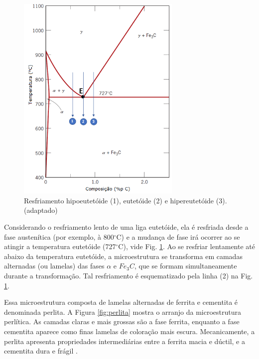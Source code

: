 \documentclass[
12pt,
openany, %
oneside, %
a4paper,			
english,			
brazil			        %
]{abntbibufjf}
\begin{document}
	\begin{figure}[H]
		\centering
		\includegraphics[width=0.7\textwidth]{eutetoide}
		\caption{Resfriamento hipoeutetóide (1), eutetóide (2) e hipereutetóide (3). \cite{callister2011materials} (adaptado)}
		\label{fig:eutetoide}
	\end{figure}

	Considerando o resfriamento lento de uma liga eutetóide, ela é resfriada desde a fase austenítica (por exemplo, à 800$^{\circ}$C) e a mudança de fase irá ocorrer ao se atingir a temperatura eutetóide (727$^{\circ}$C), vide Fig. \ref{fig:eutetoide}. Ao se resfriar lentamente até abaixo da temperatura eutetóide, a microestrutura se transforma em camadas alternadas (ou lamelas) das fases $\alpha$ e $Fe_3C$, que se formam simultaneamente durante a transformação. Tal resfriamento é esquematizado pela linha (2) na Fig. \ref{fig:eutetoide}.
	
	Essa microestrutura composta de lamelas alternadas de ferrita e cementita é denominada perlita. A Figura \ref{fig:perlita} mostra o arranjo da microestrutura perlítica. As camadas claras e mais grossas são a fase ferrita, enquanto a fase cementita aparece como finas lamelas de coloração mais escura. Mecanicamente, a perlita apresenta propriedades intermediárias entre a ferrita macia e dúctil, e a cementita dura e frágil \cite{callister2011materials}.
	
\end{document}
